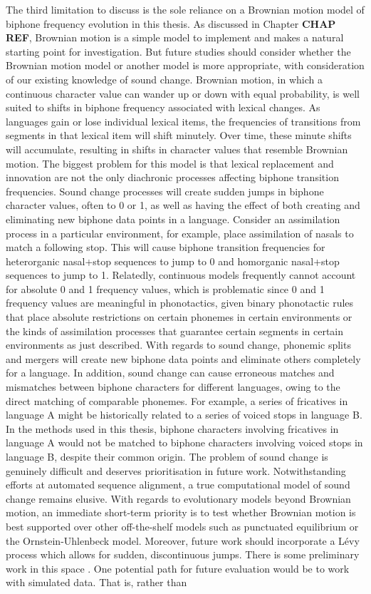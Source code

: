 The third limitation to discuss is the sole reliance on a Brownian motion model of biphone frequency evolution in this thesis. As discussed in Chapter \textbf{CHAP REF}, Brownian motion is a simple model to implement and makes a natural starting point for investigation. But future studies should consider whether the Brownian motion model or another model is more appropriate, with consideration of our existing knowledge of sound change. Brownian motion, in which a continuous character value can wander up or down with equal probability, is well suited to shifts in biphone frequency associated with lexical changes. As languages gain or lose individual lexical items, the frequencies of transitions from segments in that lexical item will shift minutely. Over time, these minute shifts will accumulate, resulting in shifts in character values that resemble Brownian motion. The biggest problem for this model is that lexical replacement and innovation are not the only diachronic processes affecting biphone transition frequencies. Sound change processes will create sudden jumps in biphone character values, often to 0 or 1, as well as having the effect of both creating and eliminating new biphone data points in a language. Consider an assimilation process in a particular environment, for example, place assimilation of nasals to match a following stop. This will cause biphone transition frequencies for heterorganic nasal+stop sequences to jump to 0 and homorganic nasal+stop sequences to jump to 1. Relatedly, continuous models frequently cannot account for absolute 0 and 1 frequency values, which is problematic since 0 and 1 frequency values are meaningful in phonotactics, given binary phonotactic rules that place absolute restrictions on certain phonemes in certain environments or the kinds of assimilation processes that guarantee certain segments in certain environments as just described. With regards to sound change, phonemic splits and mergers will create new biphone data points and eliminate others completely for a language. In addition, sound change can cause erroneous matches and mismatches between biphone characters for different languages, owing to the direct matching of comparable phonemes. For example, a series of fricatives in language A might be historically related to a series of voiced stops in language B. In the methods used in this thesis, biphone characters involving fricatives in language A would not be matched to biphone characters involving voiced stops in language B, despite their common origin. The problem of sound change is genuinely difficult and deserves prioritisation in future work. Notwithstanding efforts at automated sequence alignment, a true computational model of sound change remains elusive. With regards to evolutionary models beyond Brownian motion, an immediate short-term priority is to test whether Brownian motion is best supported over other off-the-shelf models such as punctuated equilibrium or the Ornstein-Uhlenbeck model. Moreover, future work should incorporate a Lévy process which allows for sudden, discontinuous jumps. There is some preliminary work in this space \autocites{landis_phylogenetic_2012}{landis_pulsed_2017}{blomberg_beyond_2020}. One potential path for future evaluation would be to work with simulated data. That is, rather than 
